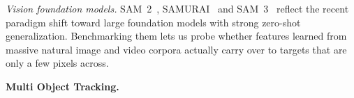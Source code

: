\documentclass{article}
\begin{document}
\textit{Vision foundation models.} SAM~2~\citep{ravi2024sam},
SAMURAI~\citep{yang2026samurai} and SAM~3~\citep{carion2026sam3} reflect
the recent paradigm shift toward large foundation models with strong
zero-shot generalization. Benchmarking them lets us probe whether
features learned from massive natural image and video corpora actually
carry over to targets that are only a few pixels across.

\noindent\textbf{Multi Object Tracking.}

\end{document}

